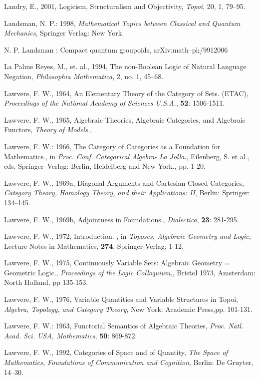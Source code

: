 \documentclass[12pt]{article}
\theoremstyle{plain}
\theoremstyle{definition}
\numberwithin{equation}{section}
\begin{document}
\begin{thebibliography}{9}
Landry, E., 2001, Logicism, Structuralism and Objectivity, {\em Topoi}, 20, 1, 79--95. 

Landsman, N. P.: 1998, \emph{Mathematical Topics between Classical and Quantum Mechanics}, Springer Verlag: New York.

N. P. Landsman : Compact quantum groupoids, arXiv:math--ph/9912006

La Palme Reyes, M., et. al., 1994, The non-Boolean Logic of Natural Language Negation, {\em Philosophia Mathematica}, 2, no. 1, 45--68.

Lawvere, F. W., 1964, An Elementary Theory of the Category of Sets. (ETAC), {\em Proceedings of the National Academy of Sciences U.S.A}., \textbf{52}: 1506-1511. 

Lawvere, F. W., 1965, Algebraic Theories, Algebraic Categories, and Algebraic Functors, {\em Theory of Models.}, 

Lawvere, F. W.: 1966, The Category of Categories as a Foundation for Mathematics., in
\emph{Proc. Conf. Categorical Algebra- La Jolla}., Eilenberg, S. et al., eds. Springer--Verlag:
Berlin, Heidelberg and New York., pp. 1-20.

Lawvere, F. W., 1969a, Diagonal Arguments and Cartesian Closed Categories, {\em Category Theory, Homology Theory, and their Applications: II}, Berlin: Springer: 134--145.  

Lawvere, F. W., 1969b, Adjointness in Foundations., {\em Dialectica}, \textbf{23}: 281-295.  

Lawvere, F. W., 1972, Introduction. , in {\em Toposes, Algebraic Geometry and Logic}, Lecture Notes in Mathematics, \textbf{274}, Springer-Verlag, 1-12.  

Lawvere, F. W., 1975, Continuously Variable Sets: Algebraic Geometry = Geometric Logic., {\em Proceedings of the Logic Colloquium,}, Bristol 1973, Amsterdam: North Holland, pp 135-153. 

Lawvere, F. W., 1976, Variable Quantities and Variable Structures in Topoi, {\em Algebra, Topology, and Category Theory}, New York: Academic Press,pp. 101-131. 

Lawvere, F. W.: 1963, Functorial Semantics of Algebraic Theories, \emph{Proc. Natl. Acad. Sci. USA, Mathematics}, \textbf{50}: 869-872.

Lawvere, F. W., 1992, Categories of Space and of Quantity, {\em The Space of Mathematics, Foundations of Communication and Cognition}, Berlin: De Gruyter, 14--30.  


\end{thebibliography}
\end{document}
